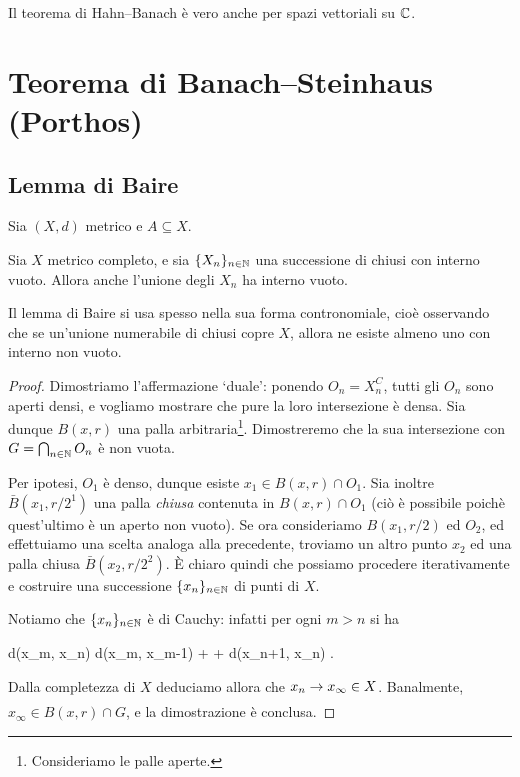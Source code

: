 \begin{remark}
	Il teorema di Hahn--Banach è vero anche per spazi vettoriali su $\mathbb{C}$.%
\end{remark}

\section{Teorema di Banach--Steinhaus (Porthos)}
\subsection{Lemma di Baire}
Sia $(X,d)$ metrico e $A \subseteq X$.

\begin{lemma}[Baire]
\label{lemma:baire}
	Sia $X$ metrico completo, e sia $\{X_n\}_{n \in \mathbb{N}}$ una successione di chiusi con interno vuoto.
	Allora anche l'unione degli $X_n$ ha interno vuoto.
\end{lemma}
\begin{remark}
	Il lemma di Baire si usa spesso nella sua forma contronomiale, cioè osservando che se un'unione numerabile di chiusi copre $X$, allora ne esiste almeno uno con interno non vuoto.
\end{remark}
\begin{proof}
	Dimostriamo l'affermazione `duale': ponendo $O_n = X_n^C$, tutti gli $O_n$ sono aperti densi, e vogliamo mostrare che pure la loro intersezione è densa.
	Sia dunque $B(x,r)$ una palla arbitraria\footnote{Consideriamo le palle aperte.}. Dimostreremo che la sua intersezione con $G = \bigcap_{n \in \mathbb{N}} O_n$ è non vuota.

	Per ipotesi, $O_1$ è denso, dunque esiste $x_1 \in B(x,r) \cap O_1$. Sia inoltre $\bar B(x_1, r/2^1)$ una palla \emph{chiusa} contenuta in $B(x, r) \cap O_1$ (ciò è possibile poichè quest'ultimo è un aperto non vuoto).
	Se ora consideriamo $B(x_1, r/2)$ ed $O_2$, ed effettuiamo una scelta analoga alla precedente, troviamo un altro punto $x_2$ ed una palla chiusa $\bar B(x_2, r/2^2)$. È chiaro quindi che possiamo procedere iterativamente e costruire una successione $\{x_n\}_{n \in \mathbb{N}}$ di punti di $X$.

	Notiamo che $\{x_n\}_{n \in \mathbb{N}}$ è di Cauchy: infatti per ogni $m > n$ si ha
	\begin{eqalign*}
		d(x_m, x_n) \leq d(x_m, x_{m-1}) + \cdots + d(x_{n+1}, x_n) \leq {}.
	\end{eqalign*}
	Dalla completezza di $X$ deduciamo allora che $x_n \underset{{}}{\rightarrow} x_\infty \in X$. Banalmente, $x_\infty \in B(x,r) \cap G$, e la dimostrazione è conclusa.
\end{proof}

